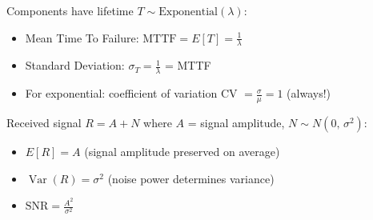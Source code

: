 
Components have lifetime $T \sim \mathrm{Exponential}(\lambda)$:

\begin{itemize}
\tightlist
\item
  Mean Time To Failure: $\mathrm{MTTF} = E[T] = \frac{1}{\lambda}$
\item
  Standard Deviation: $\sigma_{T} = \frac{1}{\lambda}$ = MTTF
\item
  For exponential: coefficient of variation CV $= \frac{\sigma}{\mu} = 1$ (always!)
\end{itemize}


Received signal $R = A + N$ where $A$ = signal amplitude, $N \sim N(0,\, \sigma^{2})$:

\begin{itemize}
\tightlist
\item
  $E[R] = A$ (signal amplitude preserved on average)
\item
  $\operatorname{Var}(R) = \sigma^{2}$ (noise power determines variance)
\item
  $\displaystyle \mathrm{SNR} = \frac{A^{2}}{\sigma^{2}}$
\end{itemize}


